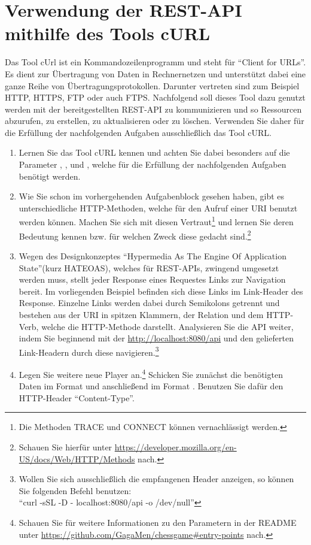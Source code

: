 \section{Verwendung der REST-API mithilfe des Tools cURL}
Das Tool cUrl ist ein Kommandozeilenprogramm und steht für \enquote{Client for \glspl{URL}}. Es dient zur Übertragung von Daten in Rechnernetzen und unterstützt dabei eine ganze Reihe von Übertragungsprotokollen. Darunter vertreten sind zum Beispiel HTTP, HTTPS, FTP oder auch FTPS. Nachfolgend soll dieses Tool dazu genutzt werden mit der bereitgestellten \gls{REST}-\gls{API} zu kommunizieren und so Ressourcen abzurufen, zu erstellen, zu aktualisieren oder zu löschen. Verwenden Sie daher für die Erfüllung der nachfolgenden Aufgaben ausschließlich das Tool cURL.
\begin{enumerate}
	\item Lernen Sie das Tool cURL kennen und achten Sie dabei besonders auf die Parameter , ,  und , welche für die Erfüllung der nachfolgenden Aufgaben benötigt werden.
	\item Wie Sie schon im vorhergehenden Aufgabenblock gesehen haben, gibt es unterschiedliche \gls{HTTP}-Methoden, welche für den Aufruf einer \gls{URI} benutzt werden können. Machen Sie sich mit diesen Vertraut\footnote{Die Methoden TRACE und CONNECT können vernachlässigt werden.} und lernen Sie deren Bedeutung kennen bzw. für welchen Zweck diese gedacht sind.\footnote{Schauen Sie hierfür unter \url{https://developer.mozilla.org/en-US/docs/Web/HTTP/Methods} nach.}
	\item Wegen des Designkonzeptes \enquote{Hypermedia As The Engine Of Application State}(kurz HATEOAS), welches für \gls{REST}-\glspl{API}, zwingend umgesetzt werden muss, stellt jeder Response eines Requestes Links zur Navigation bereit. Im vorliegenden Beispiel befinden sich diese Links im Link-Header des Response. Einzelne Links werden dabei durch Semikolons getrennt und bestehen aus der \gls{URI} in spitzen Klammern, der Relation und dem \gls{HTTP}-Verb, welche die \gls{HTTP}-Methode darstellt. Analysieren Sie die \gls{API} weiter, indem Sie beginnend mit der \url{http://localhost:8080/api} und den gelieferten Link-Headern durch diese navigieren.\footnote{Wollen Sie sich ausschließlich die empfangenen Header anzeigen, so können Sie folgenden Befehl benutzen:\\\enquote{curl -sSL -D - localhost:8080/api -o /dev/null}}
	\item Legen Sie weitere neue Player an.\footnote{\label{foot:readmeEntryPoints}Schauen Sie für weitere Informationen zu den Parametern in der README unter \url{https://github.com/GagaMen/chessgame\#entry-points} nach.} Schicken Sie zunächst die benötigten Daten im Format  und anschließend im Format . Benutzen Sie dafür den \gls{HTTP}-Header \enquote{Content-Type}.

\end{enumerate}
